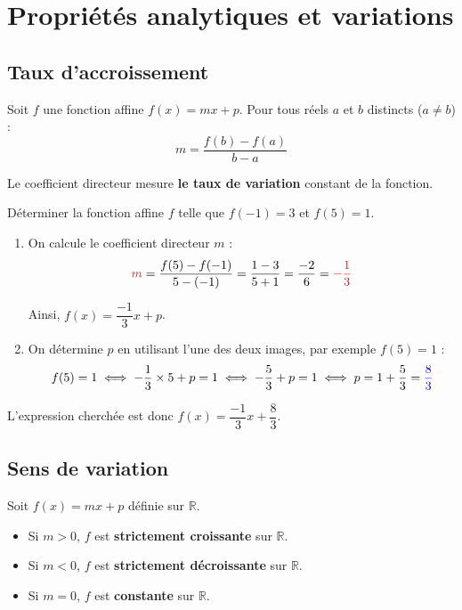 \section{Propriétés analytiques et variations}

\subsection{Taux d'accroissement}

\begin{prop}
	Soit $f$ une fonction affine $f(x) = mx + p$. Pour tous réels $a$ et $b$ distincts ($a \neq b$) :
	\[
		m = \frac{f(b) - f(a)}{b - a}
	\]

	Le coefficient directeur mesure \textbf{le taux de variation} constant de la fonction.
\end{prop}

\begin{methode}
	Déterminer la fonction affine $f$ telle que $f(-1) = 3$ et $f(5) = 1$.

	\begin{correction}
		\nline
		\begin{enumerate}
			\item On calcule le coefficient directeur $m$ :
			      \[
				      \textcolor{red}{m} = \frac{f(5) - f(-1)}{5 - (-1)} = \frac{1 - 3}{5 + 1} = \frac{-2}{6} = \textcolor{red}{-\frac{1}{3}}
			      \]

			      Ainsi, $f(x) = \dfrac{-1}{3}x + p$.
			\item On détermine $p$ en utilisant l'une des deux images, par exemple $f(5) = 1$ :
			      \[
				      f(5) = 1 \iff -\frac{1}{3} \times 5 + p = 1 \iff -\frac{5}{3} + p = 1 \iff p = 1 + \frac{5}{3} = \textcolor{blue}{\frac{8}{3}}
			      \]
		\end{enumerate}

		L'expression cherchée est donc $f(x) = \dfrac{-1}{3}x + \dfrac{8}{3}$.
	\end{correction}
\end{methode}

\newpage

\subsection{Sens de variation}

\begin{prop}
	Soit $f(x) = mx + p$ définie sur $\mathbb{R}$.
	\begin{itemize}
		\item Si $m > 0$, $f$ est \textbf{strictement croissante} sur $\mathbb{R}$.
		\item Si $m < 0$, $f$ est \textbf{strictement décroissante} sur $\mathbb{R}$.
		\item Si $m = 0$, $f$ est \textbf{constante} sur $\mathbb{R}$.
	\end{itemize}
\end{prop}

